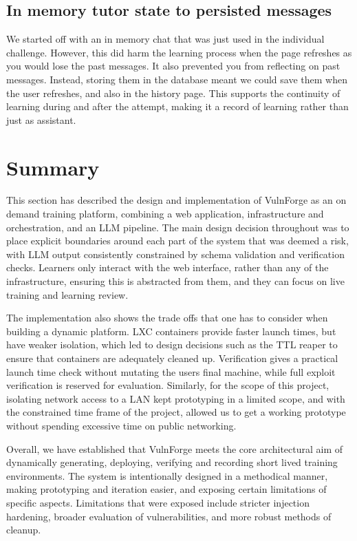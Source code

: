 \subsection{In memory tutor state to persisted messages}\label{sec:tutor-state}

We started off with an in memory chat that was just used in the individual challenge. However, this did harm the learning process when the page refreshes as you would lose the past messages. It also prevented you from reflecting on past messages. Instead, storing them in the database meant we could save them when the user refreshes, and also in the history page. This supports the continuity of learning during and after the attempt, making it a record of learning rather than just as assistant.


\section{Summary}\label{sec:summary}

This section has described the design and implementation of VulnForge as an on demand training platform, combining a web application, infrastructure and orchestration, and an LLM pipeline. The main design decision throughout was to place explicit boundaries around each part of the system that was deemed a risk, with LLM output consistently constrained by schema validation and verification checks. Learners only interact with the web interface, rather than any of the infrastructure, ensuring this is abstracted from them, and they can focus on live training and learning review.

The implementation also shows the trade offs that one has to consider when building a dynamic platform. LXC containers provide faster launch times, but have weaker isolation, which led to design decisions such as the TTL reaper to ensure that containers are adequately cleaned up. Verification gives a practical launch time check without mutating the users final machine, while full exploit verification is reserved for evaluation. Similarly, for the scope of this project, isolating network access to a LAN kept prototyping in a limited scope, and with the constrained time frame of the project, allowed us to get a working prototype without spending excessive time on public networking.

Overall, we have established that VulnForge meets the core architectural aim of dynamically generating, deploying, verifying and recording short lived training environments. The system is intentionally designed in a methodical manner, making prototyping and iteration easier, and exposing certain limitations of specific aspects. Limitations that were exposed include stricter injection hardening, broader evaluation of vulnerabilities, and more robust methods of cleanup.
